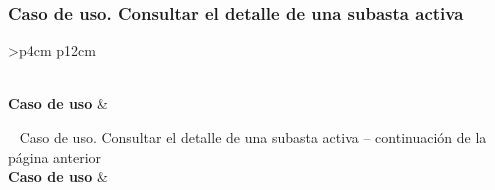 \subsubsection{Caso de uso. Consultar el detalle de una subasta activa} \label{sec:cu_consultar-detalle-subasta}
\begin{longtable}{
    >{}p{4cm}
    p{12cm}
    }
    \caption{Caso de uso. Consultar el detalle de una subasta activa} \label{table:cu_consultar-detalle-subasta} \\
    \toprule
    \textbf{Caso de uso} &  \\
    \endfirsthead
    
    {{ \tablename\ \thetable{} Caso de uso. Consultar el detalle de una subasta activa -- continuación de la página anterior}} \\
    \toprule
    \textbf{Caso de uso} &  \\
    \midrule
    \endhead
    
    \midrule
     \\ 
    \endfoot
    
    \bottomrule
    \endlastfoot
    

\end{longtable}
